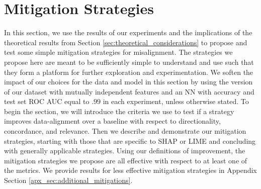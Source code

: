 \documentclass[mnsc,blindrev]{informs3}
\begin{document}
\section{Mitigation Strategies}
    \label{sec:mitigation_strategies}
    In this section, we use the results of our experiments and the implications of the theoretical results from Section \ref{sec:theoretical_considerations} to propose and test some simple mitigation strategies for misalignment. The strategies we propose here are meant to be sufficiently simple to understand and use such that they form a platform for further exploration and experimentation. We soften the impact of our choices for the data and model in this section by using the version of our dataset with mutually independent features and an NN with accuracy and test set ROC AUC equal to $.99$ in each experiment, unless otherwise stated. To begin the section, we will introduce the criteria we use to test if a strategy improves data-alignment over a baseline with respect to directionality, concordance, and relevance. Then we describe and demonstrate our mitigation strategies, starting with those that are specific to SHAP or LIME and concluding with generally applicable strategies. Using our definitions of improvement, the mitigation strategies we propose are all effective with respect to at least one of the metrics. We provide results for less effective mitigation strategies in Appendix Section \ref{apx_sec:additional_mitigations}. 

    
\end{document}
